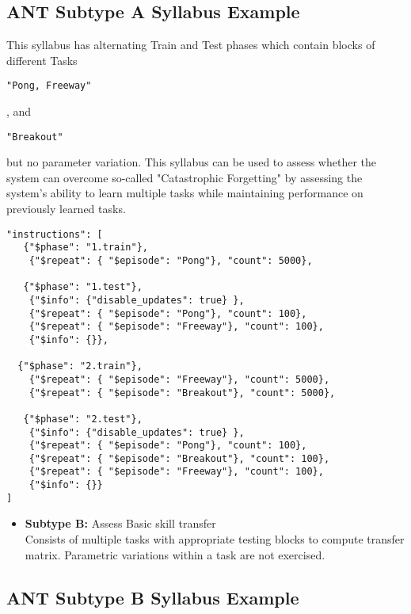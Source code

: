 \subsection*{ANT Subtype A Syllabus Example}

This syllabus has alternating Train and Test phases which contain blocks of different Tasks
\begin{small}
\verb|"Pong, Freeway"|
\end{small}
, and
\begin{small}
\verb|"Breakout"|
\end{small} but no parameter variation. This syllabus can be used to assess whether the system can overcome so-called "Catastrophic Forgetting" by assessing the system's ability to learn multiple tasks while maintaining performance on previously learned tasks.

\begin{small}
\begin{verbatim}
"instructions": [    
   {"$phase": "1.train"}, 
    {"$repeat": { "$episode": "Pong"}, "count": 5000}, 

   {"$phase": "1.test"},   
    {"$info": {"disable_updates": true} },
    {"$repeat": { "$episode": "Pong"}, "count": 100},  
    {"$repeat": { "$episode": "Freeway"}, "count": 100},  
    {"$info": {}},
   
  {"$phase": "2.train"},  
    {"$repeat": { "$episode": "Freeway"}, "count": 5000},
    {"$repeat": { "$episode": "Breakout"}, "count": 5000},

   {"$phase": "2.test"},   
    {"$info": {"disable_updates": true} },
    {"$repeat": { "$episode": "Pong"}, "count": 100},
    {"$repeat": { "$episode": "Breakout"}, "count": 100}, 
    {"$repeat": { "$episode": "Freeway"}, "count": 100}, 
    {"$info": {}}
]
\end{verbatim}
\end{small}

\begin{itemize}                   
    \item \textbf{Subtype B:} Assess Basic skill transfer\\
        Consists of multiple tasks with appropriate testing blocks to compute transfer matrix. Parametric variations within a task are not exercised.\\
\end{itemize}

\subsection*{ANT Subtype B Syllabus Example}

